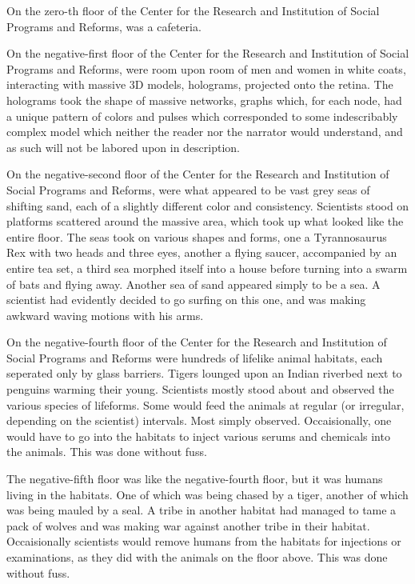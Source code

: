 \documentclass[12pt]{book}
\begin{document}
On the zero-th floor of the Center for the Research and Institution of Social Programs and Reforms, was a cafeteria.

On the negative-first floor of the  Center for the Research and Institution of Social Programs and Reforms, were room upon room of men and women in white coats, interacting with massive 3D models, holograms, projected onto the retina. The holograms took the shape of massive networks, graphs which, for each node, had a unique pattern of colors and pulses which corresponded to some indescribably complex model which neither the reader nor the narrator would understand, and as such will not be labored upon in description.

On the negative-second floor of the Center for the Research and Institution of Social Programs and Reforms, were what appeared to be vast grey seas of shifting sand, each of a slightly different color and consistency. Scientists stood on platforms scattered around the massive area, which took up what looked like the entire floor. The seas took on various shapes and forms, one a Tyrannosaurus Rex with two heads and three eyes, another a flying saucer, accompanied by an entire tea set, a third sea morphed itself into a house before turning into a swarm of bats and flying away. Another sea of sand appeared simply to be a sea. A scientist had evidently decided to go surfing on this one, and was making awkward waving motions with his arms.

On the negative-fourth floor of the Center for the Research and Institution of Social Programs and Reforms were hundreds of lifelike animal habitats, each seperated only by glass barriers. Tigers lounged upon an Indian riverbed next to penguins warming their young. Scientists mostly stood about and observed the various species of lifeforms. Some would feed the animals at regular (or irregular, depending on the scientist) intervals. Most simply observed. Occaisionally, one would have to go into the habitats to inject various serums and chemicals into the animals. This was done without fuss.

The negative-fifth floor was like the negative-fourth floor, but it was humans living in the habitats. One of which was being chased by a tiger, another of which was being mauled by a seal. A tribe in another habitat had managed to tame a pack of wolves and was making war against another tribe in their habitat. Occaisionally scientists would remove humans from the habitats for injections or examinations, as they did with the animals on the floor above. This was done without fuss.
\end{document}
